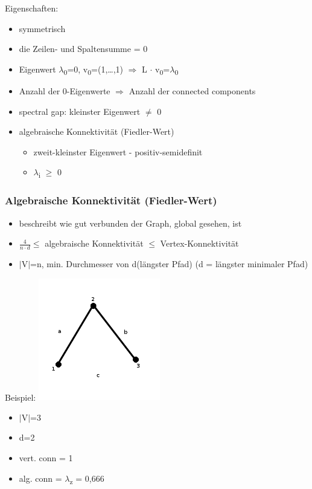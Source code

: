 Eigenschaften:
\begin{itemize}
	\item symmetrisch
	\item die Zeilen- und Spaltensumme = 0
	\item Eigenwert $\lambda$\textsubscript{0}=0, v\textsubscript{0}=(1,\ldots,1) $\Rightarrow$ L $\cdot$ v\textsubscript{0}=$\lambda$\textsubscript{0}
	\item Anzahl der 0-Eigenwerte $\Rightarrow$ Anzahl der connected components
	\item spectral gap: kleinster Eigenwert $\neq$ 0
	\item algebraische Konnektivität (Fiedler-Wert)
	\begin{itemize}
		\item zweit-kleinster Eigenwert - positiv-semidefinit
		\item $\lambda$\textsubscript{i} $\geq$ 0
	\end{itemize}
\end{itemize}

\subsubsection{Algebraische Konnektivität (Fiedler-Wert)}
\begin{itemize}
	\item beschreibt wie gut verbunden der Graph, global gesehen, ist
	\item $\frac{4}{n \cdot d} \leq$ algebraische Konnektivität $\leq$ Vertex-Konnektivität
	\item $|$V$|$=n, min. Durchmesser von d(längster Pfad) (d = längster minimaler Pfad)
\end{itemize}

Beispiel:
\includegraphics[width=0.4\textwidth]{lectures/161028/pix/dreieck.png}\newline
\begin{itemize}
	\item $\mid$V$\mid$=3
	\item d=2
	\item vert. conn = 1
	\item alg. conn = $\lambda$\textsubscript{z} = 0,666 
\end{itemize}

